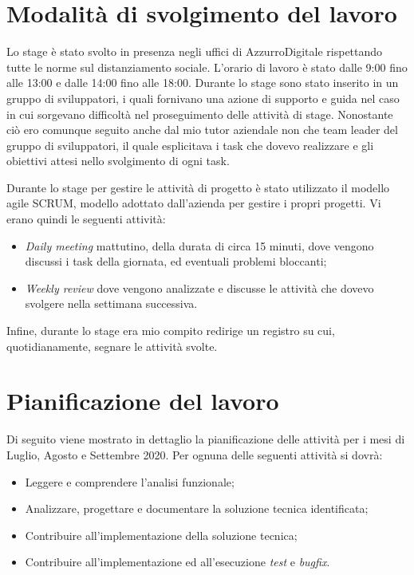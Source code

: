 \section{Modalità di svolgimento del lavoro}
Lo stage è stato svolto in presenza negli uffici di AzzurroDigitale rispettando tutte le norme sul distanziamento sociale. L'orario di lavoro è stato dalle 9:00 fino alle 13:00 e dalle 14:00 fino alle 18:00. Durante lo stage sono stato inserito in un gruppo di sviluppatori, i quali fornivano una azione di supporto e guida nel caso in cui sorgevano difficoltà nel proseguimento delle attività di stage. Nonostante ciò ero comunque seguito anche dal mio tutor aziendale non che team leader del gruppo di sviluppatori, il quale esplicitava i task che dovevo realizzare e gli obiettivi attesi nello svolgimento di ogni task. 

Durante lo stage per gestire le attività di progetto è stato utilizzato il modello agile \gls{SCRUM}\glsfirstoccur, modello adottato dall'azienda per gestire i propri progetti.
Vi erano quindi le seguenti attività:
\begin{itemize}
	\item \emph{Daily meeting} mattutino, della durata di circa 15 minuti, dove vengono discussi i task della giornata, ed eventuali problemi bloccanti;
	\item \emph{Weekly review} dove vengono analizzate e discusse le attività che dovevo svolgere nella settimana successiva.
\end{itemize}

Infine, durante lo stage era mio compito redirige un registro su cui, quotidianamente, segnare le attività svolte.

\section{Pianificazione del lavoro}

Di seguito viene mostrato in dettaglio la pianificazione delle attività per i mesi di Luglio, Agosto e Settembre 2020.
Per ognuna delle seguenti attività si dovrà:
\begin{itemize}
	\item Leggere e comprendere l’analisi funzionale;
	\item Analizzare, progettare e documentare la soluzione tecnica identificata;
	\item Contribuire all’implementazione della soluzione tecnica;
	\item Contribuire all’implementazione ed all’esecuzione \emph{test} e \emph{bugfix}.
\end{itemize}

